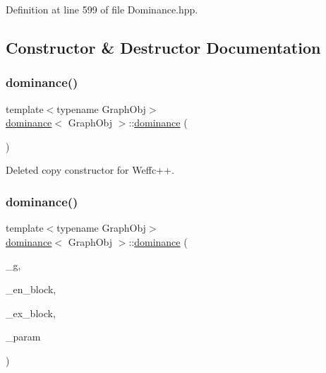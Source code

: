 Definition at line 599 of file Dominance.\+hpp.



\subsection{Constructor \& Destructor Documentation}
\mbox{\label{classdominance_a2a4b902f1d46646f6471991088c6d9f4}} 
\subsubsection{\texorpdfstring{dominance()}{dominance()}\hspace{0.1cm}{\footnotesize\ttfamily [1/2]}}
{\footnotesize\ttfamily template$<$typename Graph\+Obj$>$ \\
\hyperlink{classdominance}{dominance}$<$ Graph\+Obj $>$\+::\hyperlink{classdominance}{dominance} (\begin{DoxyParamCaption}\item[{const \hyperlink{classdominance}{dominance}$<$ Graph\+Obj $>$ \&}]{ }\end{DoxyParamCaption})\hspace{0.3cm}{\ttfamily [delete]}}



Deleted copy constructor for Weffc++. 

\mbox{\label{classdominance_a002f9eab77b6a52a9e3896a881710229}} 
\subsubsection{\texorpdfstring{dominance()}{dominance()}\hspace{0.1cm}{\footnotesize\ttfamily [2/2]}}
{\footnotesize\ttfamily template$<$typename Graph\+Obj$>$ \\
\hyperlink{classdominance}{dominance}$<$ Graph\+Obj $>$\+::\hyperlink{classdominance}{dominance} (\begin{DoxyParamCaption}\item[{const Graph\+Obj \&}]{\+\_\+g,  }\item[{const \hyperlink{classdominance_acc73faf26e73171b15fd0ff6c63ca393}{Vertex}}]{\+\_\+en\+\_\+block,  }\item[{const \hyperlink{classdominance_acc73faf26e73171b15fd0ff6c63ca393}{Vertex}}]{\+\_\+ex\+\_\+block,  }\item[{const \hyperlink{Parameter_8hpp_a37841774a6fcb479b597fdf8955eb4ea}{Parameter\+Const\+Ref}}]{\+\_\+param }\end{DoxyParamCaption})\hspace{0.3cm}{\ttfamily [inline]}}



